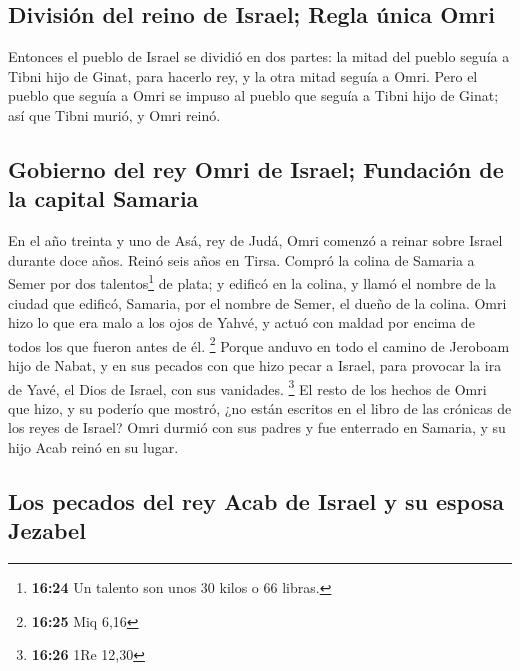 \hypertarget{divisiuxf3n-del-reino-de-israel-regla-uxfanica-omri}{%
\subsection{División del reino de Israel; Regla única
Omri}\label{divisiuxf3n-del-reino-de-israel-regla-uxfanica-omri}}

 Entonces el pueblo de Israel se dividió en dos partes:
la mitad del pueblo seguía a Tibni hijo de Ginat, para hacerlo rey, y la
otra mitad seguía a Omri.  Pero el pueblo que seguía a
Omri se impuso al pueblo que seguía a Tibni hijo de Ginat; así que Tibni
murió, y Omri reinó.

\hypertarget{gobierno-del-rey-omri-de-israel-fundaciuxf3n-de-la-capital-samaria}{%
\subsection{Gobierno del rey Omri de Israel; Fundación de la capital
Samaria}\label{gobierno-del-rey-omri-de-israel-fundaciuxf3n-de-la-capital-samaria}}

 En el año treinta y uno de Asá, rey de Judá, Omri
comenzó a reinar sobre Israel durante doce años. Reinó seis años en
Tirsa.  Compró la colina de Samaria a Semer por dos
talentos\footnote{\textbf{16:24} Un talento son unos 30 kilos o 66
  libras.} de plata; y edificó en la colina, y llamó el nombre de la
ciudad que edificó, Samaria, por el nombre de Semer, el dueño de la
colina.  Omri hizo lo que era malo a los ojos de Yahvé, y
actuó con maldad por encima de todos los que fueron antes de él.
\footnote{\textbf{16:25} Miq 6,16}  Porque anduvo en todo
el camino de Jeroboam hijo de Nabat, y en sus pecados con que hizo pecar
a Israel, para provocar la ira de Yavé, el Dios de Israel, con sus
vanidades. \footnote{\textbf{16:26} 1Re 12,30}  El resto
de los hechos de Omri que hizo, y su poderío que mostró, ¿no están
escritos en el libro de las crónicas de los reyes de Israel?
 Omri durmió con sus padres y fue enterrado en Samaria, y
su hijo Acab reinó en su lugar.

\hypertarget{los-pecados-del-rey-acab-de-israel-y-su-esposa-jezabel}{%
\subsection{Los pecados del rey Acab de Israel y su esposa
Jezabel}\label{los-pecados-del-rey-acab-de-israel-y-su-esposa-jezabel}}

